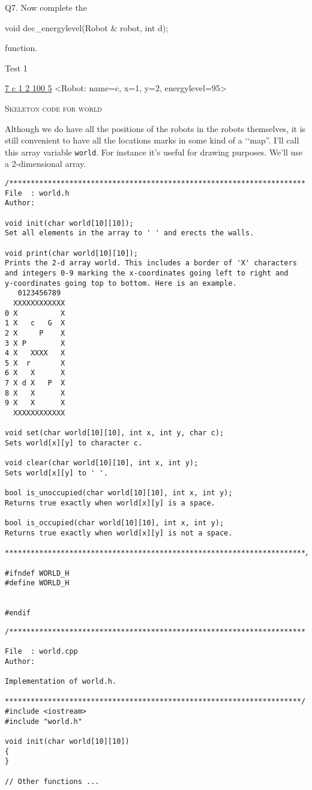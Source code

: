 Q7.
Now complete the
\begin{console}[commandchars=\\\{\}]
void dec_energylevel(Robot & robot, int d);
\end{console}
function.

Test 1
\begin{console}[commandchars=\\\{\}]
\underline{7 c 1 2 100 5}
<Robot: name=c, x=1, y=2, energylevel=95>
\end{console}



\newpage
\textsc{Skeleton code for world}

Although we do have all the positions of the robots in the robots themselves,
it is still convenient to have all the locations marks in some kind of a 
\lq\lq map''.
I'll call this array variable \verb!world!.
For instance it's useful for drawing purposes.
We'll use a 2-dimensional array.

{\small
\begin{Verbatim}[frame=single]
/*********************************************************************
File  : world.h
Author: 

void init(char world[10][10]);
Set all elements in the array to ' ' and erects the walls.

void print(char world[10][10]);
Prints the 2-d array world. This includes a border of 'X' characters
and integers 0-9 marking the x-coordinates going left to right and 
y-coordinates going top to bottom. Here is an example.
   0123456789
  XXXXXXXXXXXX
0 X          X
1 X   c   G  X
2 X     P    X
3 X P        X
4 X   XXXX   X
5 X  r       X
6 X   X      X
7 X d X   P  X
8 X   X      X
9 X   X      X
  XXXXXXXXXXXX

void set(char world[10][10], int x, int y, char c);
Sets world[x][y] to character c.

void clear(char world[10][10], int x, int y);
Sets world[x][y] to ' '.

bool is_unoccupied(char world[10][10], int x, int y);
Returns true exactly when world[x][y] is a space.

bool is_occupied(char world[10][10], int x, int y);
Returns true exactly when world[x][y] is not a space.

**********************************************************************/

#ifndef WORLD_H
#define WORLD_H


#endif
\end{Verbatim}
\begin{Verbatim}[frame=single]
/*********************************************************************

File  : world.cpp
Author:

Implementation of world.h.

*********************************************************************/
#include <iostream>
#include "world.h"

void init(char world[10][10])
{
}

// Other functions ...

\end{Verbatim}
}


